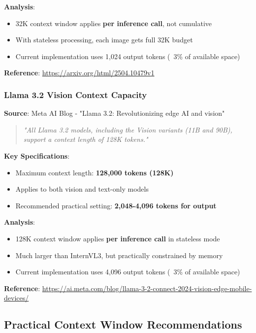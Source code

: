 \documentclass[11pt,a4paper]{article}
\begin{document}
\textbf{Analysis}:
\begin{itemize}[leftmargin=*]
    \item 32K context window applies \textbf{per inference call}, not cumulative
    \item With stateless processing, each image gets full 32K budget
    \item Current implementation uses 1,024 output tokens (~3\% of available space)
\end{itemize}

\textbf{Reference}: \url{https://arxiv.org/html/2504.10479v1}

\subsubsection{Llama 3.2 Vision Context Capacity}

\textbf{Source}: Meta AI Blog - "Llama 3.2: Revolutionizing edge AI and vision"

\begin{quote}
\textit{"All Llama 3.2 models, including the Vision variants (11B and 90B), support a context length of 128K tokens."}
\end{quote}

\textbf{Key Specifications}:
\begin{itemize}[leftmargin=*]
    \item Maximum context length: \textbf{128,000 tokens (128K)}
    \item Applies to both vision and text-only models
    \item Recommended practical setting: \textbf{2,048-4,096 tokens for output}
\end{itemize}

\textbf{Analysis}:
\begin{itemize}[leftmargin=*]
    \item 128K context window applies \textbf{per inference call} in stateless mode
    \item Much larger than InternVL3, but practically constrained by memory
    \item Current implementation uses 4,096 output tokens (~3\% of available space)
\end{itemize}

\textbf{Reference}: \url{https://ai.meta.com/blog/llama-3-2-connect-2024-vision-edge-mobile-devices/}

\subsection{Practical Context Window Recommendations}
\end{document}
